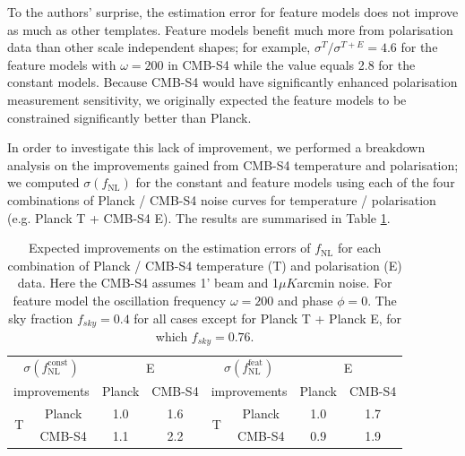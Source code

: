 To the authors' surprise, the estimation error for feature models does not improve as much as other templates. Feature models benefit much more from polarisation data than other scale independent shapes; for example, $\sigma^{T}/\sigma^{T+E} = 4.6$ for the feature models with $\omega=200$ in CMB-S4 while the value equals 2.8 for the constant models. Because CMB-S4 would have significantly enhanced polarisation measurement sensitivity, we originally expected the feature models to be constrained significantly better than Planck.

In order to investigate this lack of improvement, we performed a breakdown analysis on the improvements gained from CMB-S4 temperature and polarisation; we computed $\sigma(f_\text{NL})$ for the constant and feature models using each of the four combinations of Planck / CMB-S4 noise curves for temperature / polarisation (e.g. Planck T + CMB-S4 E). The results are summarised in Table \ref{forecast mixed}.

\begin{table}[ht]
	\caption{Expected improvements on the estimation errors of $f_\text{NL}$ for each combination of Planck / CMB-S4 temperature (T) and polarisation (E) data. Here the CMB-S4 assumes 1' beam and 1$\mu K$arcmin noise. For feature model the oscillation frequency $\omega=200$ and phase $\phi=0$. The sky fraction $f_{sky}=0.4$ for all cases except for Planck T + Planck E, for which $f_{sky}=0.76$.}
	\centering
	\label{forecast mixed}
	\renewcommand{\arraystretch}{1.5}
	\begin{tabular}{c c c c c c c c}
		\toprule
		\multicolumn{2}{c}{$\sigma(f_\text{NL}^\text{const})$}  &  \multicolumn{2}{c}{E}  & \multicolumn{2}{c}{$\sigma(f_\text{NL}^\text{feat})$}  &  \multicolumn{2}{c}{E}  \\
		\cmidrule(lr){3-4} \cmidrule(lr){7-8} 
		\multicolumn{2}{c}{improvements}  & Planck & CMB-S4 & \multicolumn{2}{c}{improvements}  & Planck & CMB-S4 \\
		\cmidrule(lr){1-4} \cmidrule(lr){5-8}
		\multirow{2}{*}{T} & Planck & 1.0 & 1.6 & \multirow{2}{*}{T} & Planck & 1.0 & 1.7 \\
		& CMB-S4 & 1.1 & 2.2 & & CMB-S4 & 0.9 & 1.9 \\
		\bottomrule
	\end{tabular}
\end{table}

